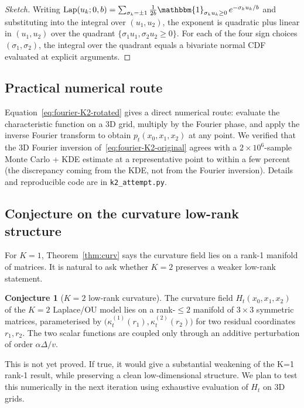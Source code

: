 \documentclass[11pt,a4paper]{article}
\theoremstyle{plainserif}
\theoremstyle{definition}
\newtheorem{conjecture}[theorem]{Conjecture}
\theoremstyle{remarkstyle}
\newcommand{\Lap}{\mathrm{Lap}}
\begin{document}
\begin{proof}[Sketch]
Writing $\Lap(u_k; 0, b) = \sum_{\sigma_k=\pm 1} \tfrac{1}{2b}\mathbbm{1}_{\sigma_k u_k \geq 0}\, e^{-\sigma_k u_k / b}$
and substituting into the integral over $(u_1,u_2)$, the exponent is
quadratic plus linear in $(u_1,u_2)$ over the quadrant
$\{\sigma_1 u_1, \sigma_2 u_2 \geq 0\}$. For each of the four sign
choices $(\sigma_1,\sigma_2)$, the integral over the quadrant equals
a bivariate normal CDF evaluated at explicit arguments.
\end{proof}

\subsection{Practical numerical route}

Equation~\eqref{eq:fourier-K2-rotated} gives a direct numerical route:
evaluate the characteristic function on a 3D grid, multiply by the
Fourier phase, and apply the inverse Fourier transform to obtain
$p_t(x_0,x_1,x_2)$ at any point. We verified that the 3D Fourier
inversion of~\eqref{eq:fourier-K2-original} agrees with a $2\times 10^6$-sample
Monte Carlo + KDE estimate at a representative point to within a few
percent (the discrepancy coming from the KDE, not from the Fourier
inversion). Details and reproducible code are in
\texttt{k2\_attempt.py}.

\subsection{Conjecture on the curvature low-rank structure}

For $K=1$, Theorem~\ref{thm:curv} says the curvature field lies on a rank-1
manifold of matrices. It is natural to ask whether $K=2$ preserves a
weaker low-rank statement.

\begin{conjecture}[$K=2$ low-rank curvature]
\label{conj:K2-rank}
The curvature field $H_t(x_0,x_1,x_2)$ of the $K=2$ Laplace/OU model
lies on a rank-$\leq 2$ manifold of $3\times 3$ symmetric matrices,
parameterised by $\bigl(\kappa_t^{(1)}(r_1), \kappa_t^{(2)}(r_2)\bigr)$
for two residual coordinates $r_1, r_2$. The two scalar functions are
coupled only through an additive perturbation of order $\alpha\Delta/v$.
\end{conjecture}

This is not yet proved. If true, it would give a substantial weakening
of the K=1 rank-1 result, while preserving a clean low-dimensional
structure. We plan to test this numerically in the next iteration
using exhaustive evaluation of $H_t$ on 3D grids.
\end{document}
